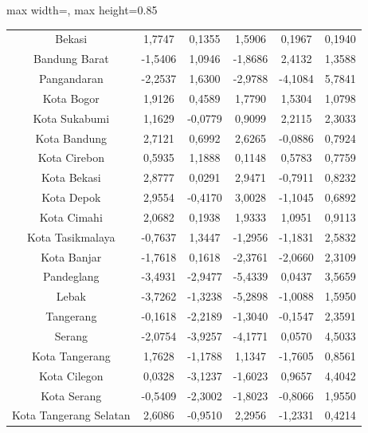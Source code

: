 \begin{table}[H]
\begin{adjustbox}{max width=\textwidth, max height=0.85\textheight}
\begin{tabular}{|c|c|c|c|c|c|}
Bekasi & 1,7747 & 0,1355 & 1,5906 & 0,1967 & 0,1940 \\
Bandung Barat & -1,5406 & 1,0946 & -1,8686 & 2,4132 & 1,3588 \\
Pangandaran & -2,2537 & 1,6300 & -2,9788 & -4,1084 & 5,7841 \\
Kota Bogor & 1,9126 & 0,4589 & 1,7790 & 1,5304 & 1,0798 \\
Kota Sukabumi & 1,1629 & -0,0779 & 0,9099 & 2,2115 & 2,3033 \\
Kota Bandung & 2,7121 & 0,6992 & 2,6265 & -0,0886 & 0,7924 \\
Kota Cirebon & 0,5935 & 1,1888 & 0,1148 & 0,5783 & 0,7759 \\
Kota Bekasi & 2,8777 & 0,0291 & 2,9471 & -0,7911 & 0,8232 \\
Kota Depok & 2,9554 & -0,4170 & 3,0028 & -1,1045 & 0,6892 \\
Kota Cimahi & 2,0682 & 0,1938 & 1,9333 & 1,0951 & 0,9113 \\
Kota Tasikmalaya & -0,7637 & 1,3447 & -1,2956 & -1,1831 & 2,5832 \\
Kota Banjar & -1,7618 & 0,1618 & -2,3761 & -2,0660 & 2,3109 \\
Pandeglang & -3,4931 & -2,9477 & -5,4339 & 0,0437 & 3,5659 \\
Lebak & -3,7262 & -1,3238 & -5,2898 & -1,0088 & 1,5950 \\
Tangerang & -0,1618 & -2,2189 & -1,3040 & -0,1547 & 2,3591 \\
Serang & -2,0754 & -3,9257 & -4,1771 & 0,0570 & 4,5033 \\
Kota Tangerang & 1,7628 & -1,1788 & 1,1347 & -1,7605 & 0,8561 \\
Kota Cilegon & 0,0328 & -3,1237 & -1,6023 & 0,9657 & 4,4042 \\
Kota Serang & -0,5409 & -2,3002 & -1,8023 & -0,8066 & 1,9550 \\
Kota Tangerang Selatan & 2,6086 & -0,9510 & 2,2956 & -1,2331 & 0,4214 \\
\hline
\end{tabular}
\end{adjustbox}
\end{table}